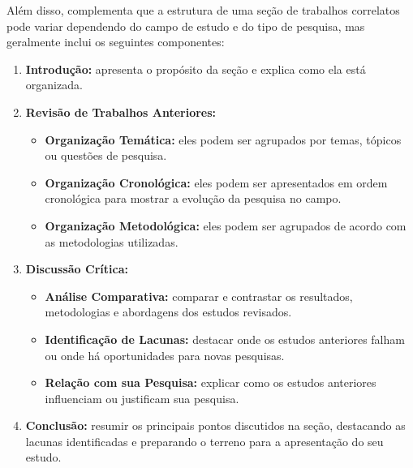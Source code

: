 Além disso,  complementa que a estrutura de uma seção de trabalhos correlatos pode variar dependendo do campo de estudo e do tipo de pesquisa, mas geralmente inclui os seguintes componentes:
\begin{enumerate}[label=\roman*., nosep, leftmargin=2.5cm]
    \item \textbf{Introdução:} apresenta o propósito da seção e explica como ela está organizada.
    \item \textbf{Revisão de Trabalhos Anteriores:}
        \begin{itemize}
            \item \textbf{Organização Temática:} eles podem ser agrupados por temas, tópicos ou questões de pesquisa.
            \item \textbf{Organização Cronológica:} eles podem ser apresentados em ordem cronológica para mostrar a evolução da pesquisa no campo.
            \item \textbf{Organização Metodológica:} eles podem ser agrupados de acordo com as metodologias utilizadas.
        \end{itemize}
    \item \textbf{Discussão Crítica:}
        \begin{itemize}
            \item \textbf{Análise Comparativa:} comparar e contrastar os resultados, metodologias e abordagens dos estudos revisados.
            \item \textbf{Identificação de Lacunas:} destacar onde os estudos anteriores falham ou onde há oportunidades para novas pesquisas.
            \item \textbf{Relação com sua Pesquisa:} explicar como os estudos anteriores influenciam ou justificam sua pesquisa.
        \end{itemize}
    \item \textbf{Conclusão:} resumir os principais pontos discutidos na seção, destacando as lacunas identificadas e preparando o terreno para a apresentação do seu estudo.
\end{enumerate}

